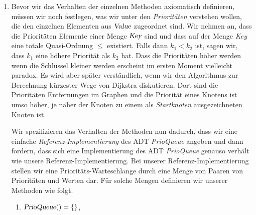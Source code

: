 \begin{Definition}
{\begin{enumerate}
\begin{enumerate}
              Der Aufruf $Q.\textsl{insert}(k,v)$ f\"ugt das Element $v$ mit der Priorit\"at $k$ in
              die Priorit\"ats-Warteschlange $Q$ ein.  
        \item $\textsl{remove}: \textsl{PrioQueue} \rightarrow \textsl{PrioQueue}$

              Der Aufruf $Q.\textsl{remove}()$ entfernt aus der Priorit\"ats-Warteschlange
              $Q$ ein Element, das eine maximale Priorit\"at hat.
        \item $\textsl{change}: \textsl{PrioQueue} \times \textsl{Key} \times \textsl{Value} \rightarrow \textsl{PrioQueue}$

              Der Aufruf $Q.\textsl{change}(k,v)$ \"andert die Priorit\"at des Elements $v$ in
              der Priorit\"ats-Warte\-schlange $Q$ so ab, dass
              $k$ die neue Priorit\"at dieses Elements ist. 
              Wir setzen dabei voraus, dass einerseits dass Element $v$ in der
              Priorit\"ats-Warteschlange $Q$ auftritt und dass andererseits die neue
              Priorit\"at mindestens so hoch ist wie die Priorit\"at, die $v$
              vorher hatte.
        \end{enumerate}
\item Bevor wir das Verhalten der einzelnen Methoden axiomatisch definieren, m\"ussen wir
      noch festlegen, was wir unter den \emph{Priorit\"aten} verstehen wollen, die den
      einzelnen Elementen aus $\textsl{Value}$ zugeordnet sind.  Wir nehmen an, dass die
      Priorit\"aten Elemente einer Menge $\textsl{Key}$ sind und dass auf der Menge \textsl{Key}
      eine totale Quasi-Ordnung $\leq$ existiert. Falls dann $k_1 < k_2$ ist, sagen wir, 
      dass $k_1$ eine h\"ohere Priorit\"at als $k_2$ hat.  Dass die Priorit\"aten h\"oher
      werden wenn die Schl\"ussel kleiner werden erscheint im ersten Moment vielleicht
      paradox. Es wird aber sp\"ater verst\"andlich, wenn wir den Algorithmus zur
      Berechnung k\"urzester Wege von Dijkstra diskutieren. Dort sind die Priorit\"aten
      Entfernungen im Graphen und die Priorit\"at eines Knotens ist umso h\"oher, je n\"aher
      der Knoten zu einem als \emph{Startknoten} ausgezeichneten Knoten ist. 

      Wir spezifizieren das Verhalten der Methoden nun dadurch, dass wir eine einfache
      \emph{Referenz-Implementierung} des ADT \textsl{PrioQueue} angeben und dann fordern,
      dass sich eine Implementierung des ADT \textsl{PrioQueue} genauso verh\"alt wie unsere
      Referenz-Implementierung.  Bei unserer Referenz-Implementierung stellen wir eine
      Priorit\"ats-Warteschlange durch eine Menge von Paaren von Priorit\"aten und Werten 
      dar.   F\"ur solche Mengen definieren wir unserer Methoden wie folgt.
      \begin{enumerate}
      \item $\textsl{PrioQueue}() = \{\}$,


\end{enumerate}
\end{enumerate}}
\end{Definition}
